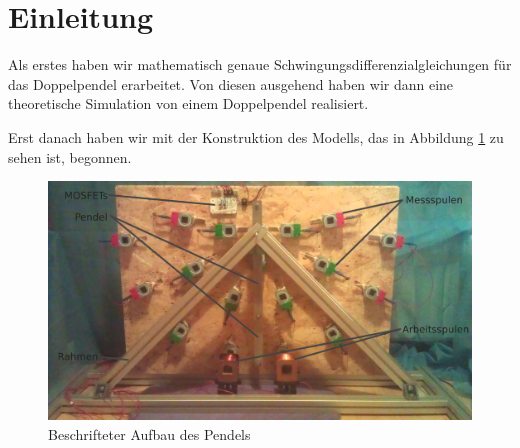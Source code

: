 \documentclass[a4paper, 10pt]{article}
\title{\mytitle}
\author{\myauthor}
\begin{document}
\maketitle
\begin{abstract}
In unserem Projekt beschäftigen wir uns mit dem Verhalten von einem chaotischen Doppelpendel. Wir wollen aus der aktuellen Bewegung eines Doppelpendels den weiteren Bewegungsablauf in einem kurzen Zeitintervall extrapolieren und dann versuchen, diese Bewegung zu beeinflussen.

Hierzu haben wir zunächst ein Doppelpendel konstruiert, bei dem durch Induktionsspulen Daten über den aktuellen Bewegungszustand erfasst werden können. Diese Daten werden in Echtzeit von einem Computer ausgewertet, um laufend eine Prognose an die Messwerte anzupassen. Anhand dieser Prognose kann entschieden werden, ob das Pendel eine unerwünschte Bewegung durchführen wird, und wenn nötig, kann mithilfe mehrerer Spulen eine korrigierende magnetische Kraft erzeugt werden. Es könnte zum Beispiel erwünscht sein, einen Überschlag zu vermeiden, oder die Energie des Systems zu kontrollieren.
\end{abstract}
\thispagestyle{empty}
\pagestyle{empty}

\clearpage
\tableofcontents

\clearpage
\setcounter{page}{1}
\pagestyle{fancy}

\section{Einleitung}
Als erstes haben wir mathematisch genaue Schwingungsdifferenzialgleichungen für das Doppelpendel erarbeitet.
Von diesen ausgehend haben wir dann eine theoretische Simulation von einem Doppelpendel realisiert.

Erst danach haben wir mit der Konstruktion des Modells, das in Abbildung \ref{fig:aufbaubeschriftet} zu sehen ist, begonnen.

\begin{figure}[bht]
  \includegraphics[width=\textwidth]{images/real_front_text.jpg}
  \caption{Beschrifteter Aufbau des Pendels}
  \label{fig:aufbaubeschriftet}
\end{figure}
\end{document}
